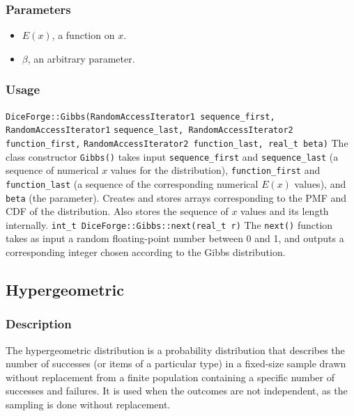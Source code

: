 \documentclass[titlepage, 11pt]{article}
\newcommand{\code}[1]
{\colorbox{light-gray}{\texttt{#1}}}
\begin{document}
\subsubsection{Parameters}
\begin{itemize}
    \item $E(x)$, a function on $x$.
    \item $\beta$, an arbitrary parameter.
\end{itemize}

\subsubsection{Usage}
\code{DiceForge::Gibbs(RandomAccessIterator1 sequence\_first, RandomAccessIterator1}
\newline
\code{\qquad\qquad\qquad\qquad\quad sequence\_last, RandomAccessIterator2 function\_first,}
\newline
\code{\qquad\qquad\qquad\qquad\quad RandomAccessIterator2 function\_last, real\_t beta)}
\newline
\newline
The class constructor \code{Gibbs()} takes input \code{sequence\_first} and \code{sequence\_last} (a sequence of numerical $x$ values for the distribution), \code{function\_first} and \code{function\_last} (a sequence of the corresponding numerical $E(x)$ values), and \code{beta} (the parameter). Creates and stores arrays corresponding to the PMF and CDF of the distribution. Also stores the sequence of $x$ values and its length internally.
\newline\newline
\code{int\_t DiceForge::Gibbs::next(real\_t r)}
\newline
\newline
The \code{next()} function takes as input a random floating-point number between 0 and 1, and outputs a corresponding integer chosen according to the Gibbs distribution.\newline

\subsection{Hypergeometric}
\subsubsection{Description}
The hypergeometric distribution is a probability distribution that describes the number of successes (or items of a particular type) in a fixed-size sample drawn without replacement from a finite population containing a specific number of successes and failures. It is used when the outcomes are not independent, as the sampling is done without replacement.
\end{document}
